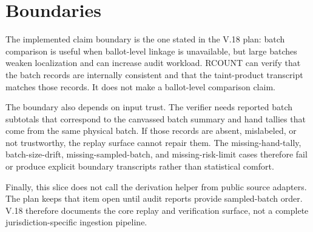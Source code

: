 \section{Boundaries}

The implemented claim boundary is the one stated in the V.18 plan: batch
comparison is useful when ballot-level linkage is unavailable, but large batches
weaken localization and can increase audit workload. RCOUNT can verify that the
batch records are internally consistent and that the taint-product transcript
matches those records. It does not make a ballot-level comparison claim.

The boundary also depends on input trust. The verifier needs reported batch
subtotals that correspond to the canvassed batch summary and hand tallies that
come from the same physical batch. If those records are absent, mislabeled, or
not trustworthy, the replay surface cannot repair them. The missing-hand-tally,
batch-size-drift, missing-sampled-batch, and missing-risk-limit cases therefore
fail or produce explicit boundary transcripts rather than statistical comfort.

Finally, this slice does not call the derivation helper from public source
adapters. The plan keeps that item open until audit reports provide sampled-batch
order. V.18 therefore documents the core replay and verification surface, not a
complete jurisdiction-specific ingestion pipeline.
